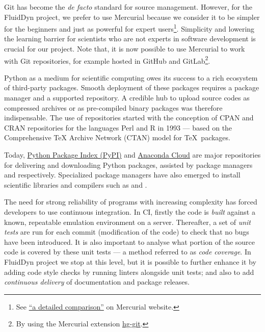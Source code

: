 Git has become the \textit{de facto} standard for source management. However,
for the FluidDyn project, we prefer to use Mercurial because we consider it to
be simpler for the beginners and just as powerful for expert users\footnote{See
\href{https://www.mercurial-scm.org/wiki/GitConcepts}{``a detailed
comparison''} on Mercurial website.}. Simplicity and lowering the learning
barrier for scientists who are not experts in software development is crucial
for our project.
%
Note that, it is now possible to use Mercurial to work with Git repositories,
for example hosted in GitHub and GitLab\footnote{By using the Mercurial
extension \href{http://hg-git.github.io/}{hg-git}.}.

 Python
as a medium for scientific computing owes its success to a rich ecosystem of
third-party packages.  Smooth deployment of these packages requires a package
manager and a supported repository. A credible hub to upload source codes as
compressed archives or as pre-compiled binary packages was therefore
indispensable. The use of repositories started with the conception of CPAN and
CRAN repositories for the languages Perl and R in 1993 --- based on the
Comprehensive TeX Archive Network (CTAN) model for \TeX\ packages. 

Today, \href{https://pypi.org}{Python Package Index (PyPI)} and
\href{https://anaconda.org}{Anaconda Cloud} are major repositories for
delivering and downloading Python packages, assisted by package managers
 and  respectively.
Specialized package managers have also emerged to install scientific
libraries and compilers such as  and .

 The need for strong reliability of
programs with increasing complexity has forced developers to use continuous
integration.
%
In CI, firstly the code is \emph{built} against a known, repeatable emulation
environment on a server. Thereafter, a set of \emph{unit tests} are run for each
commit (modification of the code) to check that no bugs have been introduced. It
is also important to analyse what portion of the source code is covered by these
unit tests --- a method referred to as \emph{code coverage}. In FluidDyn project
we stop at this level, but it is possible to further enhance it by adding code
style checks by running linters alongside unit tests; and also to add
\emph{continuous delivery} of documentation and package releases.


